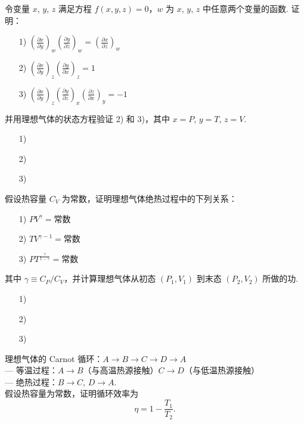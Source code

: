 \documentclass{assignment}
\begin{document}
\begin{prob}
    令变量 $x$, $y$, $z$ 满足方程 $f(x,y,z)=0$，$w$ 为 $x$, $y$, $z$ 中任意两个变量的函数. 证明：
    \begin{itemize}
        \item[1)] $\left(\frac{\partial x}{\partial y}\right)_w\left(\frac{\partial y}{\partial z}\right)_w=\left(\frac{\partial x}{\partial z}\right)_w$
        \item[2)] $\left(\frac{\partial x}{\partial y}\right)_z\left(\frac{\partial y}{\partial x}\right)_z=1$
        \item[3)] $\left(\frac{\partial x}{\partial y}\right)_z\left(\frac{\partial y}{\partial z}\right)_x\left(\frac{\partial z}{\partial x}\right)_y=-1$
    \end{itemize}
    并用理想气体的状态方程验证 2) 和 3)，其中 $x=P$, $y=T$, $z=V$.
\end{prob}
\begin{pf}
    \begin{itemize}
        \item[1)] 
        \item[2)] 
        \item[3)] 
    \end{itemize}
\end{pf}

\begin{prob}
    假设热容量 $C_V$ 为常数，证明理想气体绝热过程中的下列关系：
    \begin{itemize}
        \item[1)] $PV^{\gamma}=$常数
        \item[2)] $TV^{\gamma-1}=$常数
        \item[3)] $PT^{\frac{\gamma}{1-\gamma}}=$常数
    \end{itemize}
    其中 $\gamma\equiv C_P/C_V$，并计算理想气体从初态 $(P_1,V_1)$ 到末态 $(P_2,V_2)$ 所做的功.
\end{prob}
\begin{sol}
    \begin{itemize}
        \item[1)] 
        \item[2)] 
        \item[3)] 
    \end{itemize}
\end{sol}

\begin{prob}
    理想气体的 Carnot 循环：$A\rightarrow B\rightarrow C\rightarrow D\rightarrow A$\\
    --- 等温过程：$A\rightarrow B$（与高温热源接触）$C\rightarrow D$（与低温热源接触）\\
    --- 绝热过程：$B\rightarrow C$, $D\rightarrow A$.\\
    假设热容量为常数，证明循环效率为
    \[
        \eta=1-\frac{T_1}{T_2}.
    \]
\end{prob}
\begin{pf}
    
\end{pf}
\end{document}
